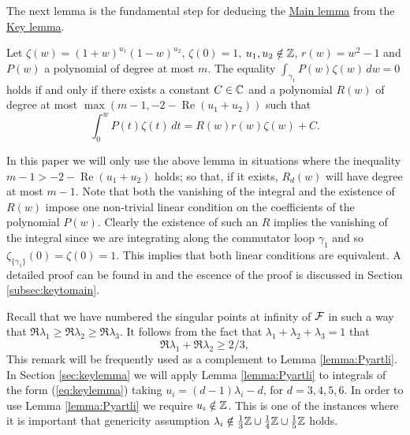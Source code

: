 The next lemma is the fundamental step for deducing the \hyperref[lemma:main]{Main lemma} from the \hyperref[lemma:key]{Key lemma}.

\begin{lemma}\label{lemma:Pyartli}
Let $\zeta(w)=(1+w)^{u_1}(1-w)^{u_2}$, $\zeta(0)=1$, $u_1,u_2\notin\mathbb{Z}$, $r(w)=w^2-1$ and $P(w)$ a polynomial of degree at most $m$. The equality $\int_{\gamma_1}P(w)\zeta(w)\,dw=0$ holds if and only if there exists a constant $C\in\mathbb{C}$ and a polynomial $R(w)$ of degree at most $\max{(m-1,-2-\operatorname{Re}{(u_1+u_2)})}$ such that
\[ \int_0^w P(t)\zeta(t)\,dt=R(w)r(w)\zeta(w)+C. \]
\end{lemma}

In this paper we will only use the above lemma in situations where the inequality $m-1>-2-\operatorname{Re}{(u_1+u_2)}$ holds; so that, if it exists, $R_d(w)$ will have degree at most $m-1$. Note that both the vanishing of the integral and the existence of $R(w)$ impose one non-trivial linear condition on the coefficients of the polynomial $P(w)$. Clearly the existence of such an $R$ implies the vanishing of the integral since we are integrating along the commutator loop $\gamma_1$ and so $\zeta_{\{\gamma_1\}}(0)=\zeta(0)=1$. This implies that both linear conditions are equivalent. A detailed proof can be found in \cite{Pyartli2000} and the escence of the proof is discussed in Section \ref{subsec:keytomain}.

Recall that we have numbered the singular points at infinity of $\mathcal{F}$ in such a way that $\Re{\lambda_1}\geq\Re{\lambda_2}\geq\Re{\lambda_3}$. It follows from the fact that $\lambda_1+\lambda_2+\lambda_3=1$ that
\begin{equation}\label{eq:inequalityRelambda}
\Re{\lambda_1}+\Re{\lambda_2}\geq 2/3,
\end{equation}
This remark will be frequently used as a complement to Lemma \ref{lemma:Pyartli}. In Section \ref{sec:keylemma} we will apply Lemma \ref{lemma:Pyartli} to integrals of the form (\ref{eq:keylemma}) taking $u_i=(d-1)\lambda_i-d$, for $d=3,4,5,6$. In order to use Lemma \ref{lemma:Pyartli} we require $u_i\notin\mathbb{Z}$. This is one of the instances where it is important that genericity assumption $\lambda_i\notin\frac{1}{3}\mathbb{Z}\cup\frac{1}{4}\mathbb{Z}\cup\frac{1}{5}\mathbb{Z}$ holds.




























